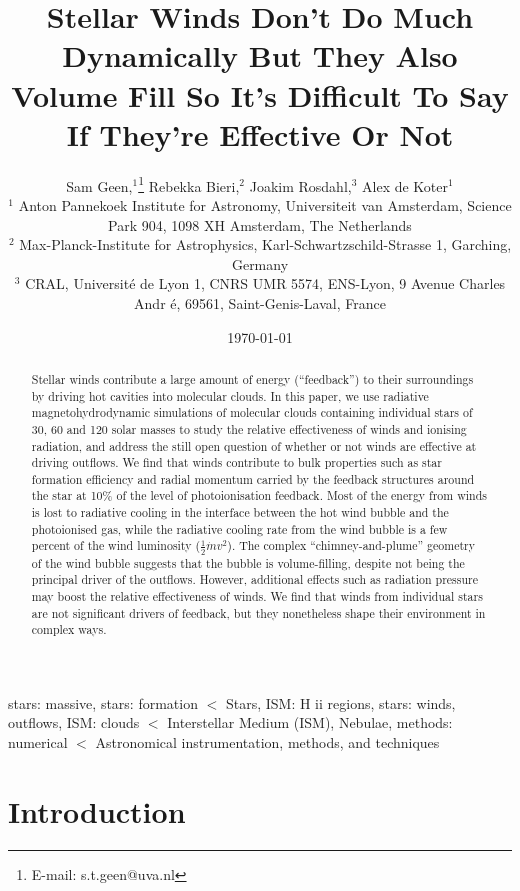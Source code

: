 \documentclass[a4paper,fleqn,usenatbib]{mnras}
\title[Are Winds Effective?]{Stellar Winds Don't Do Much Dynamically But They Also Volume Fill So It's Difficult To Say If They're Effective Or Not}
\author[Geen et al]{
Sam Geen,$^{1}$\thanks{E-mail: s.t.geen@uva.nl}
Rebekka Bieri,$^{2}$
Joakim Rosdahl,$^{3}$
Alex de Koter$^{1}$
\\
$^{1}$ Anton Pannekoek Institute for Astronomy, Universiteit van Amsterdam, Science Park 904, 1098 XH Amsterdam, The Netherlands\\
$^{2}$ Max-Planck-Institute for Astrophysics, Karl-Schwartzschild-Strasse 1, Garching, Germany\\
$^{3}$ CRAL, Universit\'e de Lyon 1, CNRS UMR 5574, ENS-Lyon, 9 Avenue Charles Andr \'e, 69561, Saint-Genis-Laval, France\\
}
\date{\today}
\begin{document}
\label{firstpage}
\pagerange{\pageref{firstpage}--\pageref{lastpage}}
\maketitle

\begin{abstract}
Stellar winds contribute a large amount of energy (``feedback'') to their surroundings by driving hot cavities into molecular clouds. In this paper, we use radiative magnetohydrodynamic simulations of molecular clouds containing individual stars of 30, 60 and 120 solar masses to study the relative effectiveness of winds and ionising radiation, and address the still open question of whether or not winds are effective at driving outflows. We find that winds contribute to bulk properties such as star formation efficiency and radial momentum carried by the feedback structures around the star at 10\% of the level of photoionisation feedback. Most of the energy from winds is lost to radiative cooling in the interface between the hot wind bubble and the photoionised gas, while the radiative cooling rate from the wind bubble is a few percent of the wind luminosity ($\frac{1}{2} \dot{m} v^2$). The complex ``chimney-and-plume'' geometry of the wind bubble suggests that the bubble is volume-filling, despite not being the principal driver of the outflows. However, additional effects such as radiation pressure may boost the relative effectiveness of winds. We find that winds from individual stars are not significant drivers of feedback, but they nonetheless shape their environment in complex ways.
\end{abstract}

\begin{keywords}
stars: massive, 
stars: formation $<$ Stars, 
ISM: H ii regions, 
stars: winds, outflows,
ISM: clouds $<$ Interstellar Medium (ISM), Nebulae,
methods: numerical $<$ Astronomical instrumentation, methods, and techniques
\end{keywords}



\section{Introduction}
\label{introduction}
\end{document}
